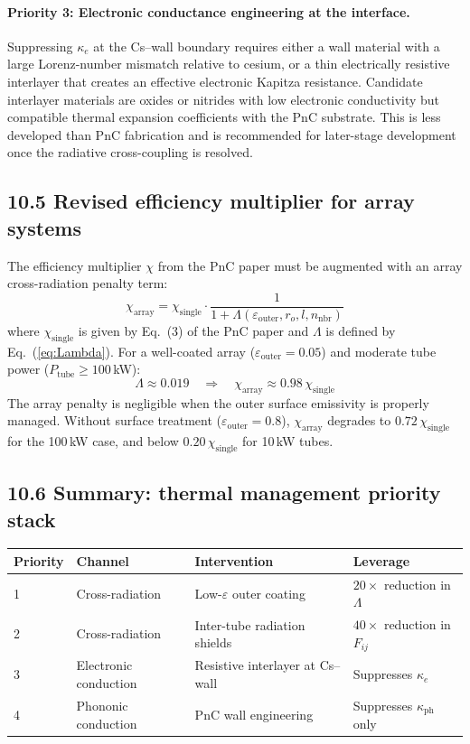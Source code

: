 \documentclass[12pt]{article}
\begin{document}
\paragraph{Priority 3: Electronic conductance engineering at the interface.}
Suppressing $\kappa_e$ at the Cs--wall boundary requires either a wall material
with a large Lorenz-number mismatch relative to cesium, or a thin electrically
resistive interlayer that creates an effective electronic Kapitza resistance.
Candidate interlayer materials are oxides or nitrides with low electronic
conductivity but compatible thermal expansion coefficients with the PnC
substrate. This is less developed than PnC fabrication and is recommended
for later-stage development once the radiative cross-coupling is resolved.

\subsection*{10.5 Revised efficiency multiplier for array systems}

The efficiency multiplier $\chi$ from the PnC paper must be augmented with
an array cross-radiation penalty term:
\begin{equation}
  \chi_{\mathrm{array}} = \chi_{\mathrm{single}} \cdot
  \frac{1}{1 + \Lambda(\varepsilon_{\mathrm{outer}}, r_o, l, n_{\mathrm{nbr}})}
  \label{eq:chi_array}
\end{equation}
where $\chi_{\mathrm{single}}$ is given by Eq.~(3) of the PnC paper and
$\Lambda$ is defined by Eq.~(\ref{eq:Lambda}). For a well-coated array
($\varepsilon_{\mathrm{outer}} = 0.05$) and moderate tube power
($P_{\mathrm{tube}} \geq 100$\,kW):
\[
  \Lambda \approx 0.019 \quad\Rightarrow\quad
  \chi_{\mathrm{array}} \approx 0.98\,\chi_{\mathrm{single}}
\]
The array penalty is negligible when the outer surface emissivity is properly
managed. Without surface treatment ($\varepsilon_{\mathrm{outer}} = 0.8$),
$\chi_{\mathrm{array}}$ degrades to $0.72\,\chi_{\mathrm{single}}$ for the
100\,kW case, and below $0.20\,\chi_{\mathrm{single}}$ for 10\,kW tubes.

\subsection*{10.6 Summary: thermal management priority stack}

\begin{center}
\begin{tabular}{llll}
\toprule
\textbf{Priority} & \textbf{Channel} & \textbf{Intervention} & \textbf{Leverage} \\
\midrule
1 & Cross-radiation     & Low-$\varepsilon$ outer coating  & $20\times$ reduction in $\Lambda$ \\
2 & Cross-radiation     & Inter-tube radiation shields      & $40\times$ reduction in $F_{ij}$ \\
3 & Electronic conduction & Resistive interlayer at Cs--wall & Suppresses $\kappa_e$ \\
4 & Phononic conduction  & PnC wall engineering              & Suppresses $\kappa_{\mathrm{ph}}$ only \\
\bottomrule
\end{tabular}
\end{center}
\end{document}
